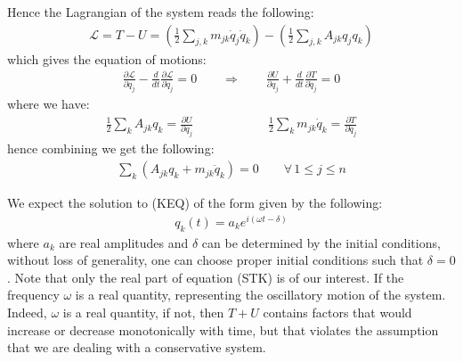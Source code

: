 \documentclass[11pt,oneside]{book}
\theoremstyle{break}
\theoremstyle{break}
\begin{document}
Hence the Lagrangian of the system reads the following:
\begin{align*}
\mathcal{L} = T - U = \left( \frac{1}{2}\sum_{j,k}m_{jk}\dot{q}_{j}\dot{q}_k\right) - \left( \frac{1}{2}\sum_{j,k}A_{jk}q_jq_k\right)
\end{align*}
which gives the equation of motions:
\begin{align*}
\frac{\partial \mathcal{L}}{\partial q_j} - \frac{d}{dt}\frac{\partial \mathcal{L}}{\partial \dot{q}_j} = 0 \qquad \Rightarrow \qquad \frac{\partial U}{\partial q_j} + \frac{d}{dt}\frac{\partial T}{\partial \dot{q}_j} = 0
\end{align*}
where we have:
\begin{align*}
\frac{1}{2}\sum_k A_{jk}q_k= \frac{\partial U}{\partial q_j} \qquad\qquad\qquad  \frac{1}{2}\sum_k m_{jk}\dot{q}_k=\frac{\partial T}{\partial \dot{q}_j}
\end{align*}
hence combining we get the following:
\begin{align*}
\sum_k \left(A_{jk}q_k + m_{jk}\ddot{q}_k\right) = 0 \qquad \forall\, 1\leq j \leq n \tag{KEQ}
\end{align*}

We expect the solution to (KEQ) of the form given by the following:
\begin{align*}
q_k (t) = a_k e^{i(\omega t -\delta)} \tag{STK}
\end{align*}
where $a_k$ are real amplitudes and $\delta$ can be determined by the initial conditions, without loss of generality, one can choose proper initial conditions such that $\delta = 0$. Note that only the real part of equation (STK) is of our interest. If the frequency $\omega$ is a real quantity, representing the oscillatory motion of the system.  Indeed, $\omega$ is a real quantity, if not, then $T+U$ contains factors that would increase or decrease monotonically with time, but that violates the assumption that we are dealing with a conservative system.\\
\end{document}
